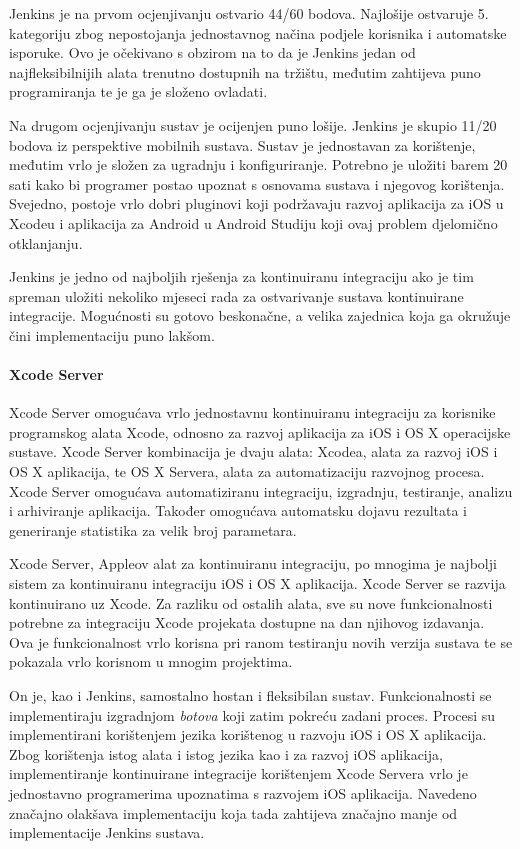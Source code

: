 \documentclass[times, utf8, diplomski, numeric]{fer}
\begin{document}
Jenkins je na prvom ocjenjivanju ostvario 44/60 bodova. Najlošije ostvaruje 5. kategoriju zbog nepostojanja jednostavnog načina podjele korisnika i automatske isporuke. Ovo je očekivano s obzirom na to da je Jenkins jedan od najfleksibilnijih alata trenutno dostupnih na tržištu, međutim zahtijeva puno programiranja te je ga je složeno ovladati.

Na drugom ocjenjivanju sustav je ocijenjen puno lošije. Jenkins je skupio 11/20 bodova iz perspektive mobilnih sustava. Sustav je jednostavan za korištenje, međutim vrlo je složen za ugradnju i konfiguriranje. Potrebno je uložiti barem 20 sati kako bi programer postao upoznat s osnovama sustava i njegovog korištenja. Svejedno, postoje vrlo dobri pluginovi koji podržavaju razvoj aplikacija za iOS u Xcodeu i aplikacija za Android u Android Studiju koji ovaj problem djelomično otklanjanju.

Jenkins je jedno od najboljih rješenja za kontinuiranu integraciju ako je tim spreman uložiti nekoliko mjeseci rada za ostvarivanje sustava kontinuirane integracije. Mogućnosti su gotovo beskonačne, a velika zajednica koja ga okružuje čini implementaciju puno lakšom.

\paragraph{Xcode Server}

Xcode Server omogućava vrlo jednostavnu kontinuiranu integraciju za korisnike programskog alata Xcode, odnosno za razvoj aplikacija za iOS i OS X operacijske sustave. Xcode Server kombinacija je dvaju alata: Xcodea, alata za razvoj iOS i OS X aplikacija, te OS X Servera, alata za automatizaciju razvojnog procesa. Xcode Server omogućava automatiziranu integraciju, izgradnju, testiranje, analizu i arhiviranje aplikacija. Također omogućava automatsku dojavu rezultata i generiranje statistika za velik broj parametara.

Xcode Server, Appleov alat za kontinuiranu integraciju, po mnogima je najbolji sistem za kontinuiranu integraciju iOS i OS X aplikacija. Xcode Server se razvija kontinuirano uz Xcode. Za razliku od ostalih alata, sve su nove funkcionalnosti potrebne za integraciju Xcode projekata dostupne na dan njihovog izdavanja. Ova je funkcionalnost vrlo korisna pri ranom testiranju novih verzija sustava te se pokazala vrlo korisnom u mnogim projektima.

On je, kao i Jenkins, samostalno hostan i fleksibilan sustav. Funkcionalnosti se implementiraju izgradnjom \textit{botova} koji zatim pokreću zadani proces. Procesi su implementirani korištenjem jezika korištenog u razvoju iOS i OS X aplikacija. Zbog korištenja istog alata i istog jezika kao i za razvoj iOS aplikacija, implementiranje kontinuirane integracije korištenjem Xcode Servera vrlo je jednostavno programerima upoznatima s razvojem iOS aplikacija. Navedeno značajno olakšava implementaciju koja tada zahtijeva značajno manje od implementacije Jenkins sustava.
\end{document}
